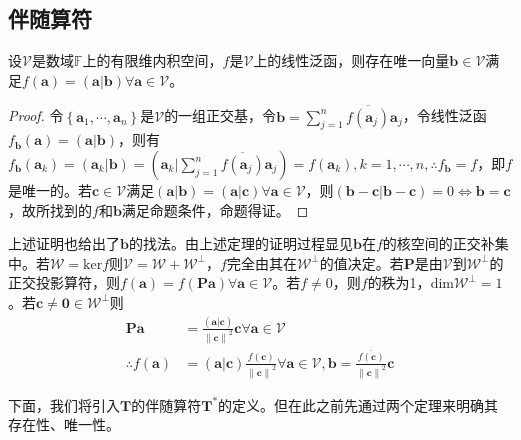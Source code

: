 \documentclass[main.tex]{subfiles}
\begin{document}
\subsection{伴随算符}
\begin{theorem}
设$\mathcal{V}$是数域$\mathbb{F}$上的有限维内积空间，$f$是$\mathcal{V}$上的线性泛函，则存在唯一向量$\mathbf{b}\in\mathcal{V}$满足$f\left(\mathbf{a}\right)=\left(\mathbf{a}|\mathbf{b}\right)\forall\mathbf{a}\in\mathcal{V}$。
\end{theorem}
\begin{proof}
令$\left\{\mathbf{a}_1,\cdots,\mathbf{a}_n\right\}$是$\mathcal{V}$的一组正交基，令$\mathbf{b}=\sum_{j=1}^n\overline{f\left(\mathbf{a}_j\right)}\mathbf{a}_j$，令线性泛函$f_\mathbf{b}\left(\mathbf{a}\right)=\left(\mathbf{a}|\mathbf{b}\right)$，则有$f_\mathbf{b}\left(\mathbf{a}_k\right)=\left(\mathbf{a}_k|\mathbf{b}\right)=\left(\mathbf{a}_k|\sum_{j=1}^n\overline{f\left(\mathbf{a}_j\right)}\mathbf{a}_j\right)=f\left(\mathbf{a}_k\right),k=1,\cdots,n,\therefore f_\mathbf{b}=f$，即$f$是唯一的。若$\mathbf{c}\in\mathcal{V}$满足$\left(\mathbf{a}|\mathbf{b}\right)=\left(\mathbf{a}|\mathbf{c}\right)\forall \mathbf{a}\in\mathcal{V}$，则$\left(\mathbf{b}-\mathbf{c}|\mathbf{b}-\mathbf{c}\right)=0\Leftrightarrow\mathbf{b}=\mathbf{c}$，故所找到的$f$和$\mathbf{b}$满足命题条件，命题得证。
\end{proof}
上述证明也给出了$\mathbf{b}$的找法。由上述定理的证明过程显见$\mathbf{b}$在$f$的核空间的正交补集中。若$\mathcal{W}=\mathrm{ker}f$则$\mathcal{V}=\mathcal{W}+\mathcal{W}^\perp$，$f$完全由其在$\mathcal{W}^\perp$的值决定。若$\mathbf{P}$是由$\mathcal{V}$到$\mathcal{W}^\perp$的正交投影算符，则$f\left(\mathbf{a}\right)=f\left(\mathbf{Pa}\right)\forall\mathbf{a}\in\mathcal{V}$。若$f\neq 0$，则$f$的秩为1，$\mathrm{dim}\mathcal{W}^\perp=1$。若$\mathbf{c}\neq\mathbf{0}\in\mathcal{W}^\perp$则
\begin{align*}\mathbf{Pa}&=\frac{\left(\mathbf{a}|\mathbf{c}\right)}{\left\|\mathbf{c}\right\|^2}\mathbf{c}\forall\mathbf{a}\in\mathcal{V}\\
\therefore f\left(\mathbf{a}\right)&=\left(\mathbf{a}|\mathbf{c}\right)\frac{f\left(\mathbf{c}\right)}{\left\|\mathbf{c}\right\|^2}\forall\mathbf{a}\in\mathcal{V},\mathbf{b}=\frac{\overline{f\left(\mathbf{c}\right)}}{\left\|\mathbf{c}\right\|^2}\mathbf{c}
\end{align*}

下面，我们将引入$\mathbf{T}$的伴随算符$\mathbf{T}^*$的定义。但在此之前先通过两个定理来明确其存在性、唯一性。
\end{document}
